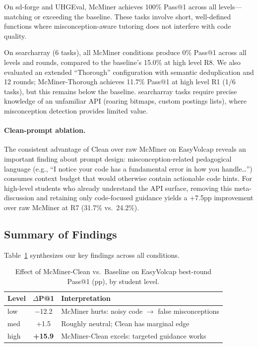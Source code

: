 \documentclass[11pt]{article}
\begin{document}
On sd-forge and UHGEval, McMiner achieves 100\% Pass@1 across all levels---matching or exceeding the baseline. These tasks involve short, well-defined functions where misconception-aware tutoring does not interfere with code quality.

On searcharray (6 tasks), all McMiner conditions produce 0\% Pass@1 across all levels and rounds, compared to the baseline's 15.0\% at high level R8. We also evaluated an extended ``Thorough'' configuration with semantic deduplication and 12 rounds; McMiner-Thorough achieves 11.7\% Pass@1 at high level R1 (1/6 tasks), but this remains below the baseline. searcharray tasks require precise knowledge of an unfamiliar API (roaring bitmaps, custom postings lists), where misconception detection provides limited value.

\paragraph{Clean-prompt ablation.} The consistent advantage of Clean over raw McMiner on EasyVolcap reveals an important finding about prompt design: misconception-related pedagogical language (e.g., ``I notice your code has a fundamental error in how you handle\ldots'') consumes context budget that would otherwise contain actionable code hints. For high-level students who already understand the API surface, removing this meta-discussion and retaining only code-focused guidance yields a +7.5pp improvement over raw McMiner at R7 (31.7\% vs.\ 24.2\%).

\subsection{Summary of Findings}

Table~\ref{tab:summary-findings} synthesizes our key findings across all conditions.

\begin{table}[t]
  \centering
  \small
  \begin{tabular}{lcp{4.2cm}}
    \toprule
    \textbf{Level} & \textbf{$\Delta$P@1} & \textbf{Interpretation} \\
    \midrule
    low  & $-$12.2 & McMiner hurts: noisy code $\rightarrow$ false misconceptions \\
    med  & +1.5 & Roughly neutral; Clean has marginal edge \\
    high & \textbf{+15.9} & McMiner-Clean excels: targeted guidance works \\
    \bottomrule
  \end{tabular}
  \caption{Effect of McMiner-Clean vs.\ Baseline on EasyVolcap best-round Pass@1 (pp), by student level.}
  \label{tab:summary-findings}
\end{table}
\end{document}
